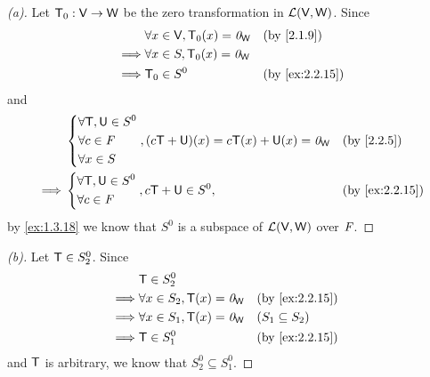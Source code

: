 \begin{proof}[(a)]
	Let \(\mathsf{T}_0 : \mathsf{V} \to \mathsf{W}\) be the zero transformation in \(\mathcal{L}(\mathsf{V}, \mathsf{W})\).
	Since
	\begin{align*}
		         & \forall x \in \V, \zT(x) = \zv_{\W} &  & \by{2.1.9}     \\
		\implies & \forall x \in S, \zT(x) = \zv_{\W}                      \\
		\implies & \zT \in S^0                         &  & \by{ex:2.2.15}
	\end{align*}
	and
	\begin{align*}
		         & \begin{dcases}
			           \forall \T, \U \in S^0 \\
			           \forall c \in \F       \\
			           \forall x \in S
		           \end{dcases}, (c\T + \U)(x) = c \T(x) + \U(x) = \zv_{\W} &  & \by{2.2.5}     \\
		\implies & \begin{dcases}
			           \forall \T, \U \in S^0 \\
			           \forall c \in \F
		           \end{dcases}, c\T + \U \in S^0,                          &  & \by{ex:2.2.15}
	\end{align*}
	by \cref{ex:1.3.18} we know that \(S^0\) is a subspace of \(\mathcal{L}(\mathsf{V}, \mathsf{W})\) over \(\mathit{F}\).
\end{proof}

\begin{proof}[(b)]
	Let \(\mathsf{T} \in S_2^0\).
	Since
	\begin{align*}
		         & \T \in S_2^0                                                 \\
		\implies & \forall x \in S_2, \T(x) = \zv_{\W} &  & \by{ex:2.2.15}      \\
		\implies & \forall x \in S_1, \T(x) = \zv_{\W} &  & (S_1 \subseteq S_2) \\
		\implies & \T \in S_1^0                        &  & \by{ex:2.2.15}
	\end{align*}
	and \(\mathsf{T}\) is arbitrary, we know that \(S_2^0 \subseteq S_1^0\).
\end{proof}

